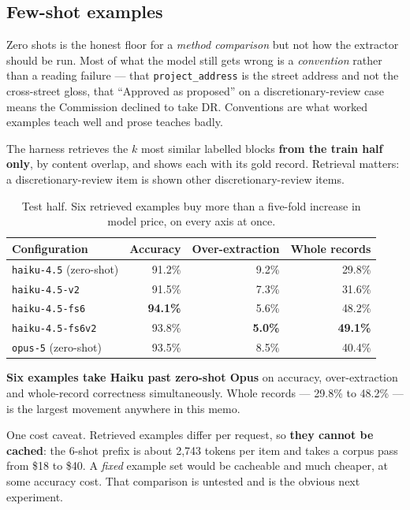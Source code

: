\documentclass[11pt]{article}
\begin{document}
\subsection{Few-shot examples}
\label{sec:fewshot}

Zero shots is the honest floor for a \emph{method comparison} but not how the extractor should
be run. Most of what the model still gets wrong is a \emph{convention} rather than a reading
failure --- that \texttt{project\_address} is the street address and not the cross-street
gloss, that ``Approved as proposed'' on a discretionary-review case means the Commission
declined to take DR. Conventions are what worked examples teach well and prose teaches badly.

The harness retrieves the $k$ most similar labelled blocks \textbf{from the train half only},
by content overlap, and shows each with its gold record. Retrieval matters: a
discretionary-review item is shown other discretionary-review items.

\begin{table}[h]
\centering
\begin{tabular}{lrrr}
\toprule
Configuration & Accuracy & Over-extraction & Whole records \\
\midrule
\texttt{haiku-4.5} (zero-shot)   & 91.2\% & 9.2\% & 29.8\% \\
\texttt{haiku-4.5-v2}            & 91.5\% & 7.3\% & 31.6\% \\
\texttt{haiku-4.5-fs6}           & \textbf{94.1\%} & 5.6\% & 48.2\% \\
\texttt{haiku-4.5-fs6v2}         & 93.8\% & \textbf{5.0\%} & \textbf{49.1\%} \\
\midrule
\texttt{opus-5} (zero-shot)      & 93.5\% & 8.5\% & 40.4\% \\
\bottomrule
\end{tabular}
\caption{Test half. Six retrieved examples buy more than a five-fold increase in model price,
on every axis at once.}
\end{table}

\textbf{Six examples take Haiku past zero-shot Opus} on accuracy, over-extraction and
whole-record correctness simultaneously. Whole records --- 29.8\% to 48.2\% --- is the largest
movement anywhere in this memo.

One cost caveat. Retrieved examples differ per request, so \textbf{they cannot be cached}: the
6-shot prefix is about 2{,}743 tokens per item and takes a corpus pass from \$18 to \$40. A
\emph{fixed} example set would be cacheable and much cheaper, at some accuracy cost. That
comparison is untested and is the obvious next experiment.
\end{document}
